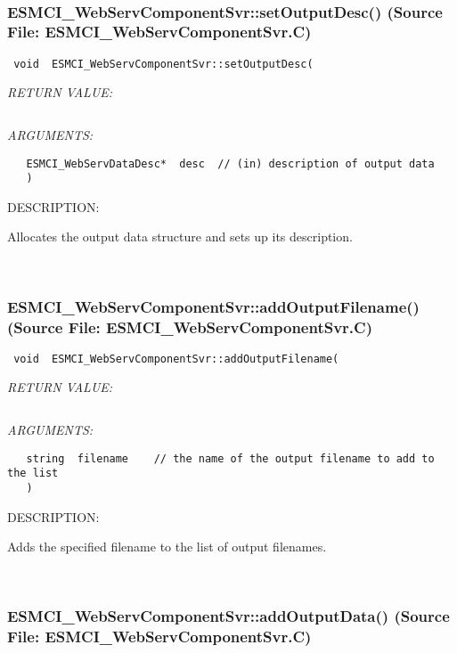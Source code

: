 \mbox{}\hrulefill\
 
\subsubsection{ESMCI\_WebServComponentSvr::setOutputDesc() (Source File: ESMCI\_WebServComponentSvr.C)}


  
\begin{verbatim} void  ESMCI_WebServComponentSvr::setOutputDesc(\end{verbatim}{\em RETURN VALUE:}
\begin{verbatim} \end{verbatim}{\em ARGUMENTS:}
\begin{verbatim}   ESMCI_WebServDataDesc*  desc  // (in) description of output data
   )\end{verbatim}
{\sf DESCRIPTION:\\ }


      Allocates the output data structure and sets up its description.
   
 
\mbox{}\hrulefill\
 
\subsubsection{ESMCI\_WebServComponentSvr::addOutputFilename() (Source File: ESMCI\_WebServComponentSvr.C)}


  
\begin{verbatim} void  ESMCI_WebServComponentSvr::addOutputFilename(\end{verbatim}{\em RETURN VALUE:}
\begin{verbatim} \end{verbatim}{\em ARGUMENTS:}
\begin{verbatim}   string  filename    // the name of the output filename to add to the list
   )\end{verbatim}
{\sf DESCRIPTION:\\ }


      Adds the specified filename to the list of output filenames.
   
 
\mbox{}\hrulefill\
 
\subsubsection{ESMCI\_WebServComponentSvr::addOutputData() (Source File: ESMCI\_WebServComponentSvr.C)}


